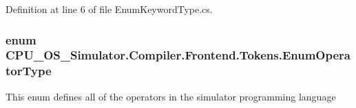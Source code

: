 Definition at line 6 of file Enum\+Keyword\+Type.\+cs.

\hypertarget{namespace_c_p_u___o_s___simulator_1_1_compiler_1_1_frontend_1_1_tokens_ac7cabb2de0258fea24dd75768143da51}{}
\subsubsection[{Enum\+Operator\+Type}]{\setlength{\rightskip}{0pt plus 5cm}enum {\bf C\+P\+U\+\_\+\+O\+S\+\_\+\+Simulator.\+Compiler.\+Frontend.\+Tokens.\+Enum\+Operator\+Type}\hspace{0.3cm}{\ttfamily [strong]}}\label{namespace_c_p_u___o_s___simulator_1_1_compiler_1_1_frontend_1_1_tokens_ac7cabb2de0258fea24dd75768143da51}


This enum defines all of the operators in the simulator programming language 

